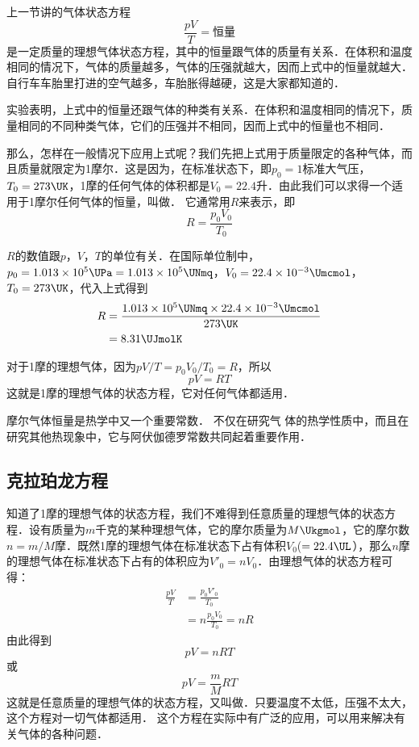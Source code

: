 上一节讲的气体状态方程
\[\frac{pV}{T}=\text{恒量} \]
是一定质量的理想气体状态方程，其中的恒量跟气体的质量有关系．在体积和温度相同的情况下，气体的质量越多，气体的压强就越大，因而上式中的恒量就越大．自行车车胎里打进的空气越多，车胎胀得越硬，这是大家都知道的．

实验表明，上式中的恒量还跟气体的种类有关系．在体积和温度相同的情况下，质量相同的不同种类气体，它们的压强并不相同，因而上式中的恒量也不相同．

那么，怎样在一般情况下应用上式呢？我们先把上式用于质量限定的各种气体，而且质量就限定为1摩尔．这是因为，在标准状态下，即$p_0=1$标准大气压，$T_0=273 \UK $，1摩的任何气体的体积都是$V_0=22.4$升．由此我们可以求得一个适用于1摩尔任何气体的恒量，叫做．
它通常用$R$来表示，即
\[R=\frac{p_0V_0}{T_0} \]

$R$的数值跟$p $，$ V $，$ T$的单位有关．在国际单位制中，$p_0=
1.013\times 10^5 \UPa=1.013\times 10^5 \UNmq$，$V_0=22. 4\times 10^{-3} \Umcmol$，$T_0=273 \UK $，代入上式得到
\[\begin{split}
R&=\frac{1.013\times 10^5 \UNmq \times  22. 4\times 10^{-3} \Umcmol}{273\UK }\\
&=8.31 \UJmolK 
\end{split} \]

对于1摩的理想气体，因为$pV/T=p_0V_0/T_0=R$，所以
$$pV=RT$$
这就是1摩的理想气体的状态方程，它对任何气体都适用．

摩尔气体恒量是热学中又一个重要常数．
不仅在研究气
体的热学性质中，而且在研究其他热现象中，它与阿伏伽德罗常数共同起着重要作用．

\subsection{克拉珀龙方程} 

知道了1摩的理想气体的状态方程，我们不难得到任意质量的理想气体的状态方程．设有质量为$m$千克的某种理想气体，它的摩尔质量为$M \Ukgmol $，它的摩尔数$n=m/M$摩．既然1摩的理想气体在标准状态下占有体积$V_0$($=22.4 \UL $），那么$n$摩的理想气体在标准状态下占有的体积应为$V'_0=nV_0$．由理想气体的状态方程可得：
\[\begin{split}
\frac{pV}{T}&=\frac{p_0V'_0}{T_0}\\
&=n\frac{p_0V_0}{T_0}=nR
\end{split} \]
由此得到
\[pV=nRT \]
或\[pV=\frac{m}{M}RT \]
这就是任意质量的理想气体的状态方程，又叫做．只要温度不太低，压强不太大，这个方程对一切气体都适用．
这个方程在实际中有广泛的应用，可以用来解决有关气体的各种问题．

